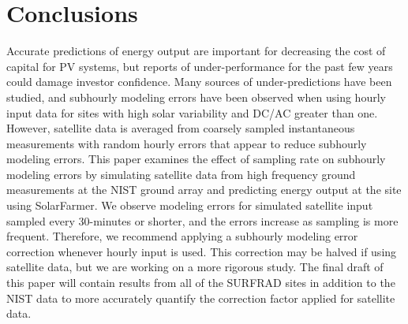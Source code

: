 \documentclass[conference]{IEEEtran}
\begin{document}
\section{Conclusions}
Accurate predictions of energy output are important for decreasing the cost of capital for PV systems, but reports of under-performance for the past few years could damage investor confidence. Many sources of under-predictions have been studied, and subhourly modeling errors have been observed when using hourly input data for sites with high solar variability and DC/AC greater than one. However, satellite data is averaged from coarsely sampled instantaneous measurements with random hourly errors that appear to reduce subhourly modeling errors. This paper examines the effect of sampling rate on subhourly modeling errors by simulating satellite data from high frequency ground measurements at the NIST ground array and predicting energy output at the site using SolarFarmer. We observe modeling errors for simulated satellite input sampled every 30-minutes or shorter, and the errors increase as sampling is more frequent. Therefore, we recommend applying a subhourly modeling error correction whenever hourly input is used. This correction may be halved if using satellite data, but we are working on a more rigorous study. The final draft of this paper will contain results from all of the SURFRAD sites in addition to the NIST data to more accurately quantify the correction factor applied for satellite data.



\end{document}
